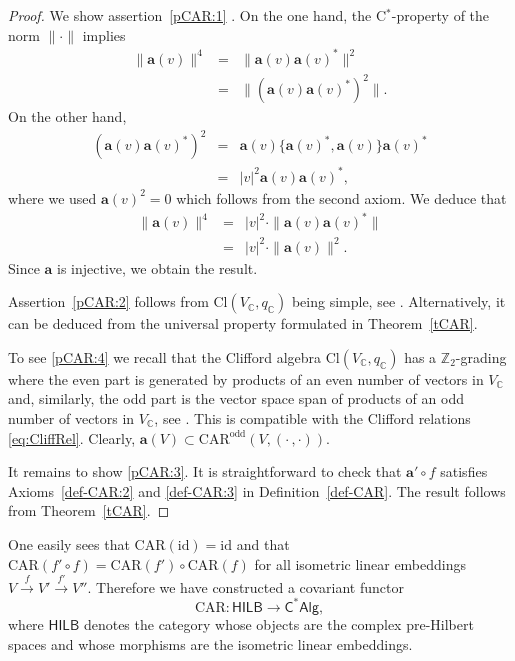 \documentclass[a4paper,11pt]{amsart}
\theoremstyle{definition}
\begin{document}
\begin{proof}
We show assertion~\eqref{pCAR:1} .
On the one hand, the {\mbox{C$^*$}}-property of the norm $\|\cdot\|$ implies
\begin{eqnarray*}  
\|{\mathbf{a}}(v)\|^4
&=&\|{\mathbf{a}}(v){\mathbf{a}}(v)^*\|^2\\
&=&\|({\mathbf{a}}(v){\mathbf{a}}(v)^*)^2\|.
\end{eqnarray*}
On the other hand, 
\begin{eqnarray*}  
({\mathbf{a}}(v){\mathbf{a}}(v)^*)^2&=&{\mathbf{a}}(v)\{{\mathbf{a}}(v)^*,{\mathbf{a}}(v)\}{\mathbf{a}}(v)^*\\
&=&|v|^2{\mathbf{a}}(v){\mathbf{a}}(v)^*,
\end{eqnarray*}
where we used ${\mathbf{a}}(v)^2=0$ which follows from the second axiom.
We deduce that
\begin{eqnarray*} 
\|{\mathbf{a}}(v)\|^4&=&|v|^2\cdot\|{\mathbf{a}}(v){\mathbf{a}}(v)^*\|\\
&=&|v|^2\cdot\|{\mathbf{a}}(v)\|^2.
\end{eqnarray*}
Since ${\mathbf{a}}$ is injective, we obtain the result.

Assertion~\eqref{pCAR:2} follows from $\mathrm{Cl}(V_{\mathbb{C}},q_{\mathbb{C}})$ being simple, see \cite[Thm.~1.2.2]{PR}.
Alternatively, it can be deduced from the universal property formulated in Theorem~\ref{tCAR}.

To see \eqref{pCAR:4} we recall that the Clifford algebra $\mathrm{Cl}(V_{\mathbb{C}},q_{\mathbb{C}})$ has a ${\mathbb{Z}}_2$-grading where the even part is generated by products of an even number of vectors in $V_{\mathbb{C}}$ and, similarly, the odd part is the vector space span of products of an odd number of vectors in $V_{\mathbb{C}}$, see \cite[p.~27]{PR}.
This is compatible with the Clifford relations \eqref{eq:CliffRel}.
Clearly, ${\mathbf{a}}(V) \subset \mathrm{CAR}^\mathrm{odd}(V,(\cdot\,,\cdot))$.

It remains to show \eqref{pCAR:3}.
It is straightforward to check that ${\mathbf{a}}'\circ f$ satisfies Axioms~\eqref{def-CAR:2} and \eqref{def-CAR:3} in Definition~\ref{def-CAR}.
The result follows from Theorem~\ref{tCAR}.
\end{proof}

One easily sees that $\mathrm{CAR}({\mathrm{id}})={\mathrm{id}}$ and that $\mathrm{CAR}(f'\circ f)=\mathrm{CAR}(f')\circ\mathrm{CAR}(f)$ for all isometric linear embeddings $V\xrightarrow{f}V'\xrightarrow{f'}V''$.
Therefore we have constructed a covariant functor
\[\mathrm{CAR}:{\mathsf{HILB}}\longrightarrow{\mathsf{C^*Alg}},\]
where ${\mathsf{HILB}}$ denotes the category whose objects are the complex pre-Hilbert spaces and whose morphisms are the isometric linear embeddings.
\end{document}
